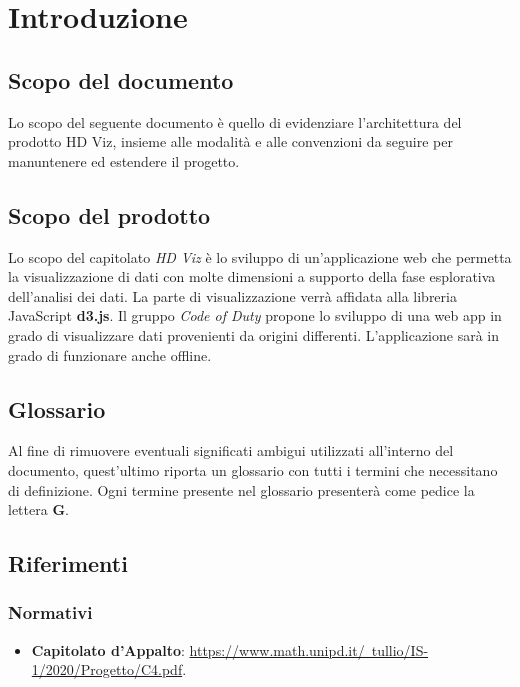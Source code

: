 \section{Introduzione}

    \subsection{Scopo del documento}
    Lo scopo del seguente documento è quello di evidenziare l'architettura del prodotto HD Viz, insieme alle modalità e alle convenzioni da seguire per manuntenere ed estendere il progetto.
    
    \subsection{Scopo del prodotto}
    Lo scopo del capitolato \emph{HD Viz} è lo sviluppo di un'applicazione web che permetta la visualizzazione di dati con molte dimensioni a supporto della fase esplorativa dell'analisi dei dati. La parte di visualizzazione verrà affidata alla libreria JavaScript \textbf{d3.js}. Il gruppo \emph{Code of Duty} propone lo sviluppo di una web app in grado di visualizzare dati provenienti da origini differenti. L'applicazione sarà in grado di funzionare anche offline.
    
    \subsection{Glossario}
    Al fine di rimuovere eventuali significati ambigui utilizzati all'interno del documento, quest'ultimo riporta un glossario con tutti i termini che necessitano di definizione. Ogni termine presente nel glossario presenterà come pedice la lettera \textbf{G}.
    
    \subsection{Riferimenti}
	\subsubsection{Normativi}
	\begin{itemize}
        \item \textbf{Capitolato d'Appalto}: \href{https://www.math.unipd.it/~tullio/IS-1/2020/Progetto/C4.pdf}{https://www.math.unipd.it/~tullio/IS-1/2020/Progetto/C4.pdf}.
	\end{itemize}
